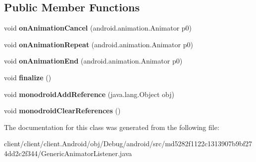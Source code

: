 \subsection*{Public Member Functions}
\begin{DoxyCompactItemize}
\item 
\hypertarget{classmd5282f1122c1313907b9bf274dd2c2f344_1_1GenericAnimatorListener_a9e9c9836cefc8026887409b85c8e1aad}{}void {\bfseries on\+Animation\+Cancel} (android.\+animation.\+Animator p0)\label{classmd5282f1122c1313907b9bf274dd2c2f344_1_1GenericAnimatorListener_a9e9c9836cefc8026887409b85c8e1aad}

\item 
\hypertarget{classmd5282f1122c1313907b9bf274dd2c2f344_1_1GenericAnimatorListener_ab3f5c1ecec301b025442b8daddf5262f}{}void {\bfseries on\+Animation\+Repeat} (android.\+animation.\+Animator p0)\label{classmd5282f1122c1313907b9bf274dd2c2f344_1_1GenericAnimatorListener_ab3f5c1ecec301b025442b8daddf5262f}

\item 
\hypertarget{classmd5282f1122c1313907b9bf274dd2c2f344_1_1GenericAnimatorListener_ad3f91c3fc44e641147adf4bfe1197822}{}void {\bfseries on\+Animation\+End} (android.\+animation.\+Animator p0)\label{classmd5282f1122c1313907b9bf274dd2c2f344_1_1GenericAnimatorListener_ad3f91c3fc44e641147adf4bfe1197822}

\item 
\hypertarget{classmd5282f1122c1313907b9bf274dd2c2f344_1_1GenericAnimatorListener_a06ca90b7df083033912c8c02826968da}{}void {\bfseries finalize} ()\label{classmd5282f1122c1313907b9bf274dd2c2f344_1_1GenericAnimatorListener_a06ca90b7df083033912c8c02826968da}

\item 
\hypertarget{classmd5282f1122c1313907b9bf274dd2c2f344_1_1GenericAnimatorListener_a1211236bf54e26d579b0398442255658}{}void {\bfseries monodroid\+Add\+Reference} (java.\+lang.\+Object obj)\label{classmd5282f1122c1313907b9bf274dd2c2f344_1_1GenericAnimatorListener_a1211236bf54e26d579b0398442255658}

\item 
\hypertarget{classmd5282f1122c1313907b9bf274dd2c2f344_1_1GenericAnimatorListener_a1eea84de65ef9458701e2eda6917c70a}{}void {\bfseries monodroid\+Clear\+References} ()\label{classmd5282f1122c1313907b9bf274dd2c2f344_1_1GenericAnimatorListener_a1eea84de65ef9458701e2eda6917c70a}

\end{DoxyCompactItemize}


The documentation for this class was generated from the following file\+:\begin{DoxyCompactItemize}
\item 
client/client/client.\+Android/obj/\+Debug/android/src/md5282f1122c1313907b9bf274dd2c2f344/Generic\+Animator\+Listener.\+java\end{DoxyCompactItemize}

